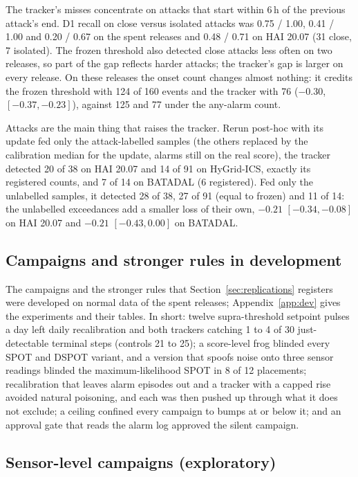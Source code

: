 \documentclass[sigconf]{acmart}
\begin{document}
The tracker's misses concentrate on attacks that start within 6\,h of the previous attack's end. D1
recall on close versus isolated attacks was 0.75 / 1.00, 0.41 / 1.00 and 0.20 / 0.67 on the spent
releases and 0.48 / 0.71 on HAI 20.07 (31 close, 7 isolated). The frozen threshold also detected
close attacks less often on two releases, so part of the gap reflects harder attacks; the tracker's
gap is larger on every release. On these releases the onset count changes almost nothing: it credits
the frozen threshold with 124 of 160 events and the tracker with 76 ($-0.30$, $[-0.37, -0.23]$),
against 125 and 77 under the any-alarm count.

Attacks are the main thing that raises the tracker. Rerun post-hoc with its update fed only the
attack-labelled samples (the others replaced by the calibration median for the update, alarms still on
the real score), the tracker detected 20 of 38 on HAI 20.07 and 14 of 91 on HyGrid-ICS, exactly its
registered counts, and 7 of 14 on BATADAL (6 registered). Fed only the unlabelled samples, it detected
28 of 38, 27 of 91 (equal to frozen) and 11 of 14: the unlabelled exceedances add a smaller loss of
their own, $-0.21$ $[-0.34, -0.08]$ on HAI 20.07 and $-0.21$ $[-0.43, 0.00]$ on BATADAL.

\subsection{Campaigns and stronger rules in development}
\label{sec:devsummary}

The campaigns and the stronger rules that Section~\ref{sec:replications} registers were developed on
normal data of the spent releases; Appendix~\ref{app:dev} gives the experiments and their tables. In
short: twelve supra-threshold setpoint pulses a day left daily recalibration and both trackers catching
1 to 4 of 30 just-detectable terminal steps (controls 21 to 25); a score-level frog blinded every SPOT
and DSPOT variant, and a version that spoofs noise onto three sensor readings blinded the
maximum-likelihood SPOT in 8 of 12 placements; recalibration that leaves alarm episodes out and a
tracker with a capped rise avoided natural poisoning, and each was then pushed up through what it does
not exclude; a ceiling confined every campaign to bumps at or below it; and an approval gate that
reads the alarm log approved the silent campaign.

\subsection{Sensor-level campaigns (exploratory)}
\label{sec:process}
\end{document}
